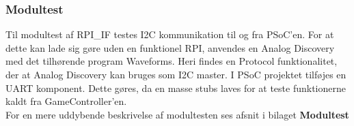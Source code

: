 \documentclass[Rapport/Playerside/RPI_IF/RPI_IF.tex]{subfiles}
\begin{document}
\subsubsection{Modultest}
Til modultest af RPI\_IF testes I2C kommunikation til og fra PSoC'en. For at dette kan lade sig gøre uden en funktionel RPI, anvendes en Analog Discovery med det tilhørende program Waveforms. Heri findes en Protocol funktionalitet, der at Analog Discovery kan bruges som I2C master. I PSoC projektet tilføjes en UART komponent. Dette gøres, da en masse stubs laves for at teste funktionerne kaldt fra GameController'en. \\

For en mere uddybende beskrivelse af modultesten ses afsnit  i bilaget \textbf{Modultest}
\end{document}
